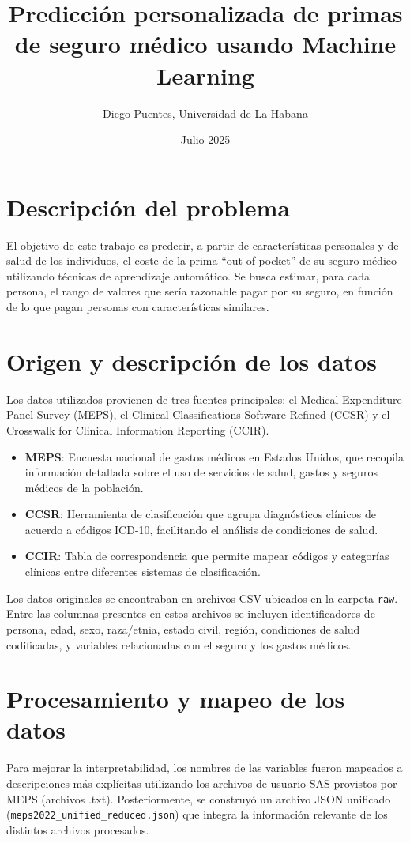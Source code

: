 \documentclass[12pt,a4paper]{article}
\title{Predicción personalizada de primas de seguro médico usando Machine Learning}
\author{Diego Puentes, Universidad de La Habana}
\date{Julio 2025}
\begin{document}
\maketitle

\section*{Descripción del problema}
El objetivo de este trabajo es predecir, a partir de características personales y de salud de los individuos, el coste de la prima ``out of pocket'' de su seguro médico utilizando técnicas de aprendizaje automático. Se busca estimar, para cada persona, el rango de valores que sería razonable pagar por su seguro, en función de lo que pagan personas con características similares.

\section*{Origen y descripción de los datos}
Los datos utilizados provienen de tres fuentes principales: el Medical Expenditure Panel Survey (MEPS), el Clinical Classifications Software Refined (CCSR) y el Crosswalk for Clinical Information Reporting (CCIR).

\begin{itemize}
    \item \textbf{MEPS}: Encuesta nacional de gastos médicos en Estados Unidos, que recopila información detallada sobre el uso de servicios de salud, gastos y seguros médicos de la población.
    \item \textbf{CCSR}: Herramienta de clasificación que agrupa diagnósticos clínicos de acuerdo a códigos ICD-10, facilitando el análisis de condiciones de salud.
    \item \textbf{CCIR}: Tabla de correspondencia que permite mapear códigos y categorías clínicas entre diferentes sistemas de clasificación.
\end{itemize}

Los datos originales se encontraban en archivos CSV ubicados en la carpeta \texttt{raw}. Entre las columnas presentes en estos archivos se incluyen identificadores de persona, edad, sexo, raza/etnia, estado civil, región, condiciones de salud codificadas, y variables relacionadas con el seguro y los gastos médicos.

\section*{Procesamiento y mapeo de los datos}
Para mejorar la interpretabilidad, los nombres de las variables fueron mapeados a descripciones más explícitas utilizando los archivos de usuario SAS provistos por MEPS (archivos .txt). Posteriormente, se construyó un archivo JSON unificado (\texttt{meps2022\_unified\_reduced.json}) que integra la información relevante de los distintos archivos procesados.
\end{document}
